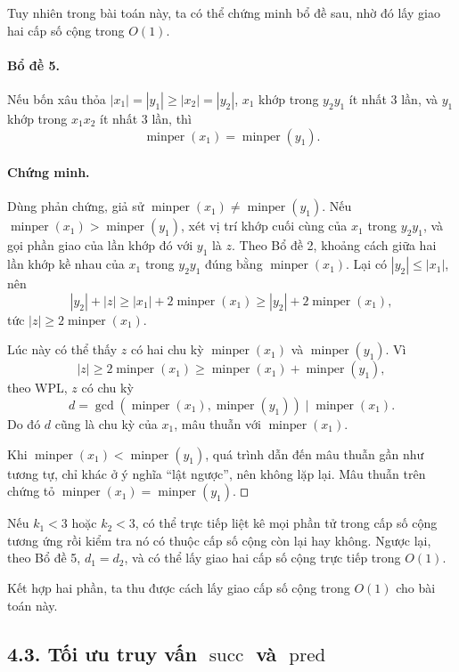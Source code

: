 \documentclass[11pt]{article}
\newcommand{\square}{\mathord{\vcenter{\hrule height .5pt
  \hbox{\vrule width .5pt height 5pt\kern5pt\vrule width .5pt}
  \hrule height .5pt}}}
\begin{document}
Tuy nhiên trong bài toán này, ta có thể chứng minh bổ đề sau, nhờ đó lấy giao
hai cấp số cộng trong \(O(1)\).

\paragraph{Bổ đề 5.}
Nếu bốn xâu thỏa \(|x_1|=|y_1|\ge |x_2|=|y_2|\), \(x_1\) khớp trong \(y_2y_1\)
ít nhất 3 lần, và \(y_1\) khớp trong \(x_1x_2\) ít nhất 3 lần, thì
\[
  \operatorname{minper}(x_1)=\operatorname{minper}(y_1).
\]

\paragraph{Chứng minh.}
Dùng phản chứng, giả sử
\(\operatorname{minper}(x_1)\ne\operatorname{minper}(y_1)\). Nếu
\(\operatorname{minper}(x_1)>\operatorname{minper}(y_1)\), xét vị trí khớp cuối
cùng của \(x_1\) trong \(y_2y_1\), và gọi phần giao của lần khớp đó với \(y_1\)
là \(z\). Theo Bổ đề 2, khoảng cách giữa hai lần khớp kề nhau của \(x_1\)
trong \(y_2y_1\) đúng bằng \(\operatorname{minper}(x_1)\). Lại có
\(|y_2|\le |x_1|\), nên
\[
  |y_2|+|z|\ge |x_1|+2\operatorname{minper}(x_1)
  \ge |y_2|+2\operatorname{minper}(x_1),
\]
tức \(|z|\ge 2\operatorname{minper}(x_1)\).

Lúc này có thể thấy \(z\) có hai chu kỳ
\(\operatorname{minper}(x_1)\) và \(\operatorname{minper}(y_1)\). Vì
\[
  |z|\ge 2\operatorname{minper}(x_1)
  \ge \operatorname{minper}(x_1)+\operatorname{minper}(y_1),
\]
theo WPL, \(z\) có chu kỳ
\[
  d=\gcd(\operatorname{minper}(x_1),\operatorname{minper}(y_1))
  \mid \operatorname{minper}(x_1).
\]
Do đó \(d\) cũng là chu kỳ của \(x_1\), mâu thuẫn với
\(\operatorname{minper}(x_1)\).

Khi \(\operatorname{minper}(x_1)<\operatorname{minper}(y_1)\), quá trình dẫn
đến mâu thuẫn gần như tương tự, chỉ khác ở ý nghĩa ``lật ngược'', nên không
lặp lại. Mâu thuẫn trên chứng tỏ
\(\operatorname{minper}(x_1)=\operatorname{minper}(y_1)\). \(\square\)

Nếu \(k_1<3\) hoặc \(k_2<3\), có thể trực tiếp liệt kê mọi phần tử trong cấp số
cộng tương ứng rồi kiểm tra nó có thuộc cấp số cộng còn lại hay không. Ngược
lại, theo Bổ đề 5, \(d_1=d_2\), và có thể lấy giao hai cấp số cộng trực tiếp
trong \(O(1)\).

Kết hợp hai phần, ta thu được cách lấy giao cấp số cộng trong \(O(1)\) cho bài
toán này.

\subsection*{4.3. Tối ưu truy vấn \texorpdfstring{\(\operatorname{succ}\)}{succ}
và \texorpdfstring{\(\operatorname{pred}\)}{pred}}
\end{document}

